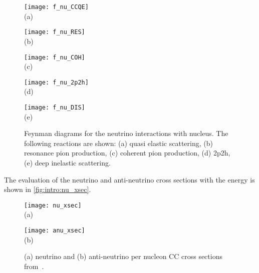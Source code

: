 \documentclass[../main.tex]{subfiles}
\begin{document}
\begin{figure}[!ht]
  \centering
  \begin{minipage}{0.29\linewidth}
    \centering
    \texttt{[image: f\_nu\_CCQE]} \\ (a)
  \end{minipage}
  \begin{minipage}{0.29\linewidth}
    \centering
    \texttt{[image: f\_nu\_RES]} \\ (b)
  \end{minipage}
  \begin{minipage}{0.29\linewidth}
    \centering
    \texttt{[image: f\_nu\_COH]} \\ (c)
  \end{minipage}
  \vfill
  \begin{minipage}{0.29\linewidth}
    \centering
    \texttt{[image: f\_nu\_2p2h]} \\ (d)
  \end{minipage}
  \begin{minipage}{0.29\linewidth}
    \centering
    \texttt{[image: f\_nu\_DIS]} \\ (e)
  \end{minipage}
  \caption{Feynman diagrams for the neutrino interactions with nucleus. The following reactions are shown: (a) quasi elastic scattering, (b) resonance pion production, (c) coherent pion production, (d) 2p2h, (e) deep inelastic scattering.}
  \label{fig:intro:f_nu_nucl}
\end{figure}

The evaluation of the neutrino and anti-neutrino cross sections with the energy is shown in \autoref{fig:intro:nu_xsec}.

\begin{figure}[!ht]
  \centering
  \begin{minipage}{0.49\linewidth}
    \centering
    \texttt{[image: nu\_xsec]} \\ (a)
  \end{minipage}
  \begin{minipage}{0.49\linewidth}
    \centering
    \texttt{[image: anu\_xsec]} \\ (b)
  \end{minipage}
  \caption{(a) neutrino and (b) anti-neutrino per nucleon CC cross sections from~\cite{Formaggio2012}.}

  \label{fig:intro:nu_xsec}
\end{figure}
\end{document}

